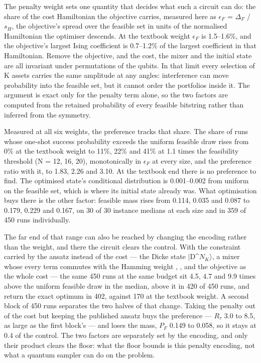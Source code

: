 \documentclass{ieeeaccess}
\begin{document}
The penalty weight sets one quantity that decides what such a circuit can do: the share of the cost Hamiltonian the objective carries, measured here as $\epsilon_{F}$ = $\Delta_{F}$ / $s_{H}$, the objective's spread over the feasible set in units of the normalised Hamiltonian the optimiser descends. At the textbook weight $\epsilon_{F}$ is 1.5--1.6\%, and the objective's largest Ising coefficient is 0.7--1.2\% of the largest coefficient in that Hamiltonian. Remove the objective, and the cost, the mixer and the initial state are all invariant under permutations of the qubits. In that limit every selection of K assets carries the same amplitude at any angles: interference can move probability into the feasible set, but it cannot order the portfolios inside it. The argument is exact only for the penalty term alone, so the two factors are computed from the retained probability of every feasible bitstring rather than inferred from the symmetry.


Measured at all six weights, the preference tracks that share. The share of runs whose one-shot success probability exceeds the uniform feasible draw rises from 0\% at the textbook weight to 11\%, 22\% and 41\% at 1.1 times the feasibility threshold (N = 12, 16, 20), monotonically in $\epsilon_{F}$ at every size, and the preference ratio with it, to 1.83, 2.26 and 3.10. At the textbook end there is no preference to find. The optimised state's conditional distribution is 0.001--0.002 from uniform on the feasible set, which is where its initial state already was. What optimisation buys there is the other factor: feasible mass rises from 0.114, 0.035 and 0.087 to 0.179, 0.229 and 0.167, on 30 of 30 instance medians at each size and in 359 of 450 runs individually.


The far end of that range can also be reached by changing the encoding rather than the weight, and there the circuit clears the control. With the constraint carried by the ansatz instead of the cost --- the Dicke state $|$D\^{}$N_{K}$$\rangle$, a mixer whose every term commutes with the Hamming weight \cite{ref45}, \cite{ref46}, and the objective as the whole cost --- the same 450 runs at the same budget sit 4.5, 4.7 and 9.9 times above the uniform feasible draw in the median, above it in 420 of 450 runs, and return the exact optimum in 402, against 170 at the textbook weight. A second block of 450 runs separates the two halves of that change. Taking the penalty out of the cost but keeping the published ansatz buys the preference --- $R_{\tau}$ 3.0 to 8.5, as large as the first block's --- and loses the mass, $P_{F}$ 0.149 to 0.058, so it stays at 0.4 of the control. The two factors are separately set by the encoding, and only their product clears the floor: what the floor bounds is this penalty encoding, not what a quantum sampler can do on the problem.
\end{document}
